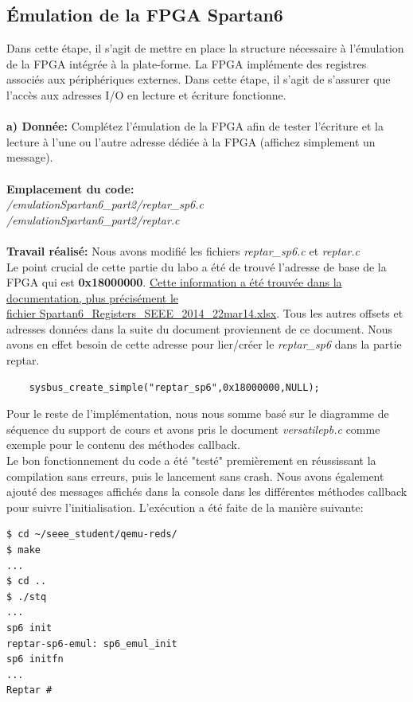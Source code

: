 \subsection{Émulation de la FPGA Spartan6}
Dans cette étape, il s'agit de mettre en place la structure nécessaire à l'émulation de la FPGA intégrée
à la plate-forme. La FPGA implémente des registres associés aux périphériques externes. Dans cette
étape, il s'agit de s'assurer que l'accès aux adresses I/O en lecture et écriture fonctionne. \\\\
\textbf{a) Donnée: }Complétez l'émulation de la FPGA afin de tester l'écriture et la lecture à l'une ou l'autre adresse
dédiée à la FPGA (affichez simplement un message). \\\\
\textbf{Emplacement du code:}\\\textit{/emulationSpartan6\_part2/reptar\_sp6.c}\\ \textit{/emulationSpartan6\_part2/reptar.c}\\\\
\textbf{Travail réalisé: }Nous avons modifié les fichiers \textit{reptar\_sp6.c} et \textit{reptar.c}\\
Le point crucial de cette partie du labo a été de trouvé l'adresse de base de la FPGA qui est \textbf{0x18000000}. \underline{Cette information a été trouvée dans la documentation, plus précisément le}\\\underline{ fichier Spartan6\_Registers\_SEEE\_2014\_22mar14.xlsx}. Tous les autres offsets et adresses données dans la suite du document proviennent de ce document. Nous avons en effet besoin de cette adresse pour lier/créer le \textit{reptar\_sp6} dans la partie reptar. 
\begin{lstlisting}
	sysbus_create_simple("reptar_sp6",0x18000000,NULL);
\end{lstlisting}
Pour le reste de l'implémentation, nous nous somme basé sur le diagramme de séquence du support de cours et avons pris le document \textit{versatilepb.c} comme exemple pour le contenu des méthodes callback.\\
Le bon fonctionnement du code a été "testé" premièrement en réussissant la compilation sans erreurs, puis le lancement sans crash. Nous avons également ajouté des messages affichés dans la console dans les différentes méthodes callback pour suivre l'initialisation. L'exécution a été faite de la manière suivante:
\begin{lstlisting}
$ cd ~/seee_student/qemu-reds/
$ make
...
$ cd ..
$ ./stq
...
sp6 init
reptar-sp6-emul: sp6_emul_init
sp6 initfn
...
Reptar # 
\end{lstlisting}

